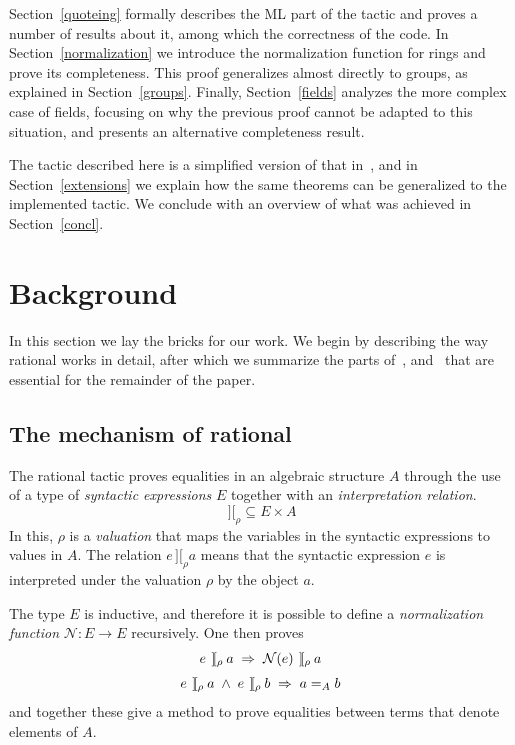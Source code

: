 \documentclass[numreferences]{kluwer}
\newcommand{\intII}{\,]\![}
\newcommand{\intrel}{\mathbin{\intII_{\rho}}}
\newcommand{\N}{\ensuremath{\mathcal{N}}}
\newcommand{\tacticname}[1]{\textsf{#1}}
\newcommand{\rational}{\tacticname{rational}}
\begin{document}
\begin{article}
Section~\ref{quoteing} formally describes the ML part of the tactic and
proves a number of results about it, among which the correctness of the
code.
In Section~\ref{normalization} we introduce the normalization function for
rings and prove its completeness.  This proof generalizes almost directly
to groups, as explained in Section~\ref{groups}.  Finally,
Section~\ref{fields} analyzes the more complex case of fields, focusing
on why the previous proof cannot be adapted to this situation, and presents
an alternative completeness result.

The tactic described here is a simplified version of that
in~\cite{lcf:wie:04}, and in Section~\ref{extensions} we explain how the
same theorems can be generalized to the implemented tactic.  We conclude
with an overview of what was achieved in Section~\ref{concl}.

\section{Background}

In this section we lay the bricks for our work.  We begin
by describing the way {\rational} works in detail, after which we
summarize the parts of~\cite{geu:pol:wie:zwa:02}, \cite{geu:wie:zwa:00}
and~\cite{lcf:wie:04} that are essential for the remainder of the paper.

\subsection{The mechanism of {\rational}}\label{tactic}

The {\rational} tactic proves equalities in an algebraic
structure $A$ through the use of a type of \emph{syntactic expressions} $E$
together with an \emph{interpretation relation}.
$$\intrel \subseteq E \times A$$
In this, $\rho$ is a \emph{valuation} that maps the variables in the
syntactic expressions to values in $A$.
The relation $e \intrel a$ means that the syntactic expression
$e$ is interpreted under the valuation $\rho$ by the object $a$.

The type $E$ is inductive, and therefore it is possible to define
a \emph{normalization function} $\N : E \to E$ recursively.
One then proves
$$
\begin{array}{c}
e \intrel a \;\Rightarrow\; \N(e) \intrel a \\
\noalign{\medskip}
e \intrel a \;\land\; e \intrel b \;\Rightarrow\; a =_A b
\end{array}
$$
and together these give a method to prove equalities between terms
that denote elements of $A$.


\end{article}
\end{document}
